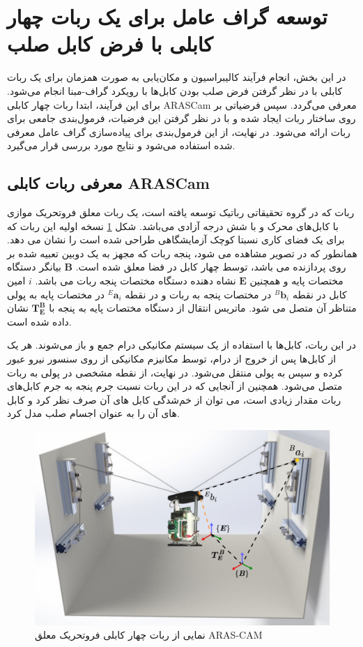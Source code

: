 \section{توسعه گراف عامل برای یک ربات چهار کابلی با فرض کابل صلب}
در این بخش، انجام فرآیند کالیبراسیون و مکان‌یابی به صورت همزمان برای یک ربات کابلی با در نظر گرفتن فرض صلب بودن کابل‌ها با رویکرد گراف-مبنا انجام می‌شود. برای این فرآیند، ابتدا ربات چهار کابلی ARASCam معرفی می‌گردد. سپس فرضیاتی بر روی ساختار ربات ایجاد شده و با در نظر گرفتن این فرضیات، فرمول‌بندی جامعی برای ربات ارائه می‌شود. در نهایت، از این فرمول‌بندی برای پیاده‌سازی گراف عامل معرفی شده استفاده می‌شود و نتایج مورد بررسی قرار می‌گیرد. 

\subsection{معرفی ربات کابلی ARASCam}
ربات  که در گروه تحقیقاتی رباتیک  توسعه یافته است، یک ربات معلق فروتحریک موازی با کابل‌های محرک و با شش درجه آزادی می‌باشد. شکل 
\ref{fig:arascam}
 نسخه اولیه این  ربات که برای یک فضای کاری نسبتا کوچک آزمایشگاهی طراحی شده است را نشان می دهد. همانطور که در تصویر مشاهده می شود، پنجه ربات که مجهز به یک دوبین تعبیه شده بر روی پردازنده 
می باشد، توسط چهار کابل در فضا معلق شده است. $\boldsymbol{B}$ بیانگر دستگاه مختصات پایه و همچنین $\boldsymbol{E}$ نشاه دهنده دستگاه مختصات پنجه ربات می باشد. $i$ امین کابل در نقطه ${}^B\!\boldsymbol{b}_i$ در مختصات پنجه به ربات و در نقطه ${}^E\!\boldsymbol{a}_i$ در مختصات پایه به پولی متناظر آن متصل می شود. ماتریس انتقال از دستگاه مختصات پایه به پنجه با 
$\boldsymbol{T}^{\boldsymbol{B}}_{\boldsymbol{E}}$
نشان داده شده است.


در این ربات، کابل‌ها با استفاده از یک سیستم مکانیکی درام جمع و باز می‌شوند. هر یک از کابل‌ها پس از خروج از درام، توسط مکانیزم مکانیکی از روی سنسور نیرو عبور کرده و سپس به پولی منتقل می‌شود. در نهایت، از نقطه مشخصی در پولی به ربات متصل می‌شود. همچنین از آنجایی که در این ربات نسبت جرم پنجه به جرم کابل‌های ربات مقدار زیادی است، می توان از خم‌شدگی کابل های آن صرف نظر کرد و کابل های آن را به عنوان اجسام صلب مدل کرد.

\begin{figure}
	\centering
	\includegraphics[width=0.5\linewidth]{img/arascam}
	\caption{نمایی از ربات چهار کابلی فروتحریک معلق ARAS-CAM}
	\label{fig:arascam}
\end{figure}

